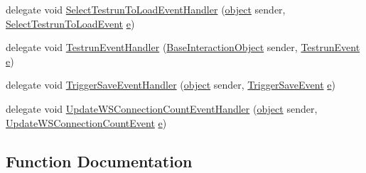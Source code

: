 \begin{DoxyCompactItemize}
\item 
delegate void \hyperlink{namespace_web_analyzer_1_1_events_aa0653fa1d1d88eca5706ba8a8db7e7bb}{Select\+Testrun\+To\+Load\+Event\+Handler} (\hyperlink{_u_i_2_h_t_m_l_resources_2js_2lib_2underscore_8min_8js_aae18b7515bb2bc4137586506e7c0c903}{object} sender, \hyperlink{class_web_analyzer_1_1_events_1_1_select_testrun_to_load_event}{Select\+Testrun\+To\+Load\+Event} \hyperlink{_u_i_2_h_t_m_l_resources_2js_2lib_2bootstrap_8min_8js_ab5902775854a8b8440bcd25e0fe1c120}{e})
\item 
delegate void \hyperlink{namespace_web_analyzer_1_1_events_ac749d30657662c0b107ea3e49caae8d9}{Testrun\+Event\+Handler} (\hyperlink{class_web_analyzer_1_1_u_i_1_1_interaction_objects_1_1_base_interaction_object}{Base\+Interaction\+Object} sender, \hyperlink{class_web_analyzer_1_1_events_1_1_testrun_event}{Testrun\+Event} \hyperlink{_u_i_2_h_t_m_l_resources_2js_2lib_2bootstrap_8min_8js_ab5902775854a8b8440bcd25e0fe1c120}{e})
\item 
delegate void \hyperlink{namespace_web_analyzer_1_1_events_a8e8e2ff467a5d5522ce9d3df28198ccf}{Trigger\+Save\+Event\+Handler} (\hyperlink{_u_i_2_h_t_m_l_resources_2js_2lib_2underscore_8min_8js_aae18b7515bb2bc4137586506e7c0c903}{object} sender, \hyperlink{class_web_analyzer_1_1_events_1_1_trigger_save_event}{Trigger\+Save\+Event} \hyperlink{_u_i_2_h_t_m_l_resources_2js_2lib_2bootstrap_8min_8js_ab5902775854a8b8440bcd25e0fe1c120}{e})
\item 
delegate void \hyperlink{namespace_web_analyzer_1_1_events_a60ab58d669ec03a2518a57dba5a59e0e}{Update\+W\+S\+Connection\+Count\+Event\+Handler} (\hyperlink{_u_i_2_h_t_m_l_resources_2js_2lib_2underscore_8min_8js_aae18b7515bb2bc4137586506e7c0c903}{object} sender, \hyperlink{class_web_analyzer_1_1_events_1_1_update_w_s_connection_count_event}{Update\+W\+S\+Connection\+Count\+Event} \hyperlink{_u_i_2_h_t_m_l_resources_2js_2lib_2bootstrap_8min_8js_ab5902775854a8b8440bcd25e0fe1c120}{e})
\end{DoxyCompactItemize}


\subsection{Function Documentation}
\hypertarget{namespace_web_analyzer_1_1_events_a902fba3fe7d4503704b73171cd38cf68}{}
